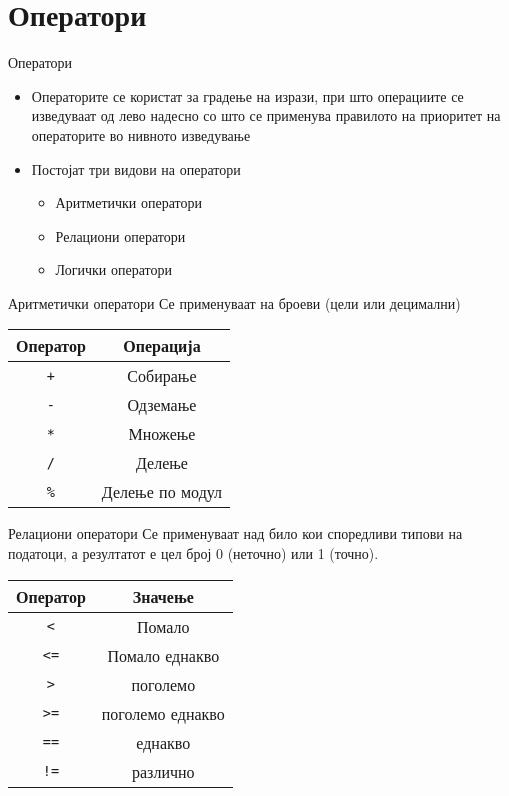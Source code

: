 \section{Оператори}

\begin{frame}{Оператори}
\begin{itemize}
\item Операторите се користат за градење на изрази, при што операциите се изведуваат од лево надесно со што се применува правилото на приоритет на операторите во нивното изведување
\item Постојат три видови на оператори
\begin{itemize}
\item Аритметички оператори
\item Релациони оператори
\item Логички оператори
\end{itemize}
\end{itemize}
\end{frame}

\begin{frame}{Аритметички оператори}
Се применуваат на броеви (цели или децимални)
\linebreak
\begin{center}
\begin{tabular}{c|c}
\textbf{Оператор} & \textbf{Операција}\\
\hline
\texttt{+} & Собирање \\
\texttt{-} & Одземање \\
\texttt{*} & Множење \\
\texttt{/} & Делење \\
\texttt{\%} & Делење по модул
\end{tabular}
\end{center}
\end{frame}

\begin{frame}{Релациони оператори}
Се применуваат над било кои споредливи типови на податоци, а резултатот е цел број 0 (неточно) или 1 (точно).
\begin{center}
\begin{tabular}{c|c}
\textbf{Оператор} & \textbf{Значење}\\
\hline
\texttt{<} & Помало \\
\texttt{<=} & Помало еднакво \\
\texttt{>} & поголемо \\
\texttt{>=} & поголемо еднакво \\
\texttt{==} & еднакво \\
\texttt{!=} & различно
\end{tabular}
\end{center}
\end{frame}

